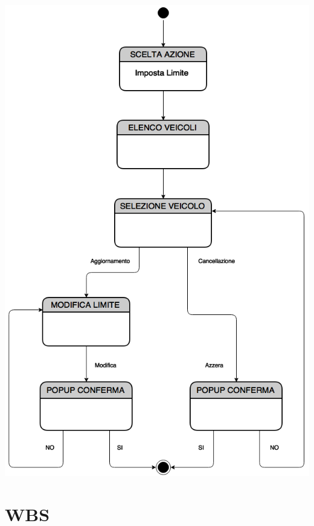 \documentclass[a4paper,12pt]{beamer}
\begin{document}
\begin{frame}

\begin{center}
\includegraphics[scale=0.4]{../UseCase/Limite.png}
\end{center}
\end{frame}


\pagebreak

\section{WBS}
\begin{frame}
\end{frame}

\begin{frame}
\end{frame}
\end{document}
